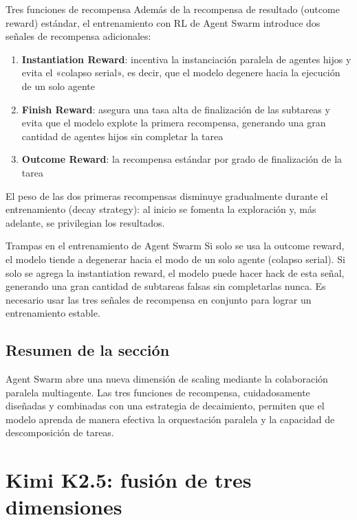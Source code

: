\documentclass[a4paper]{article}
\begin{document}
\begin{importantbox}{Tres funciones de recompensa}
Además de la recompensa de resultado (outcome reward) estándar, el entrenamiento con RL de Agent Swarm introduce dos señales de recompensa adicionales:
\begin{enumerate}
    \item \textbf{Instantiation Reward}: incentiva la instanciación paralela de agentes hijos y evita el «colapso serial», es decir, que el modelo degenere hacia la ejecución de un solo agente
    \item \textbf{Finish Reward}: asegura una tasa alta de finalización de las subtareas y evita que el modelo explote la primera recompensa, generando una gran cantidad de agentes hijos sin completar la tarea
    \item \textbf{Outcome Reward}: la recompensa estándar por grado de finalización de la tarea
\end{enumerate}
El peso de las dos primeras recompensas disminuye gradualmente durante el entrenamiento (decay strategy): al inicio se fomenta la exploración y, más adelante, se privilegian los resultados.
\end{importantbox}

\begin{warningbox}{Trampas en el entrenamiento de Agent Swarm}
Si solo se usa la outcome reward, el modelo tiende a degenerar hacia el modo de un solo agente (colapso serial). Si solo se agrega la instantiation reward, el modelo puede hacer hack de esta señal, generando una gran cantidad de subtareas falsas sin completarlas nunca. Es necesario usar las tres señales de recompensa en conjunto para lograr un entrenamiento estable.
\end{warningbox}

\subsection{Resumen de la sección}

Agent Swarm abre una nueva dimensión de scaling mediante la colaboración paralela multiagente. Las tres funciones de recompensa, cuidadosamente diseñadas y combinadas con una estrategia de decaimiento, permiten que el modelo aprenda de manera efectiva la orquestación paralela y la capacidad de descomposición de tareas.
\section{Kimi K2.5: fusión de tres dimensiones}
\end{document}
